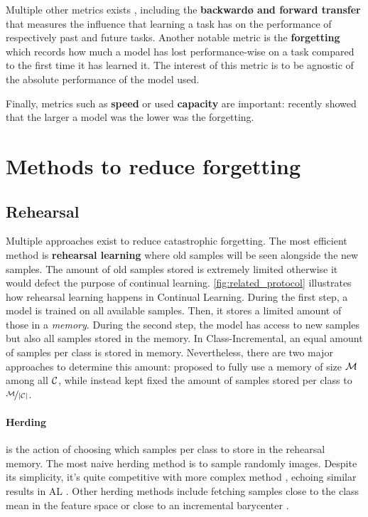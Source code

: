 Multiple other metrics exists \citep{diaz2018continualmetrics}, including the \textbf{backwardø and forward transfer} \citep{lopezpaz2017gem}
that measures the influence that learning a task has on the performance of respectively past and
future tasks. Another notable metric is the \textbf{forgetting} \citep{chaudhry2018riemannien_walk}
which records how much a model has lost performance-wise on a task compared to the first time it has
learned it. The interest of this metric is to be agnostic of the absolute performance of the model used.

Finally, metrics such as \textbf{speed} or used \textbf{capacity} are important: \cite{ramasesh2022scalecontinual}
recently showed that the larger a model was the lower was the forgetting.

\section{Methods to reduce forgetting}
\label{sec:related_methods}

\subsection{Rehearsal}
\label{sec:related_rehearsal}

Multiple approaches exist to reduce catastrophic forgetting. The most efficient method is
\textbf{rehearsal learning} where old samples will be seen alongside the new samples. The amount of
old samples stored is extremely limited otherwise it would defect the purpose of continual learning.
\autoref{fig:related_protocol} illustrates how rehearsal learning happens in Continual Learning.
During the first step, a model is trained on all available samples. Then, it stores a limited amount
of those in a \textit{memory}. During the second step, the model has access to new samples but also
all samples stored in the memory. In Class-Incremental, an equal amount of samples per class is
stored in memory. Nevertheless, there are two major approaches to determine this amount:
\cite{rebuffi2017icarl} proposed to fully use a memory of size $\mathcal{M}$ among all $\mathcal{C}$, while
\cite{hou2019ucir} instead kept fixed the amount of samples stored per class to $\nicefrac{\mathcal{M}}{|\mathcal{C}|}$.

\paragraph{Herding} is the action of choosing which samples per class to store in the rehearsal
memory. The most naive herding method is to sample randomly images. Despite its simplicity, it's
quite competitive with more complex method \citep{castro2018end_to_end_inc_learn}, echoing similar
results in \ac{AL} \citep{gal2017activelearning}. Other herding methods include fetching samples
close to the class mean in the feature space \citep{castro2018end_to_end_inc_learn} or close to an
incremental barycenter \citep{rebuffi2017icarl}.

